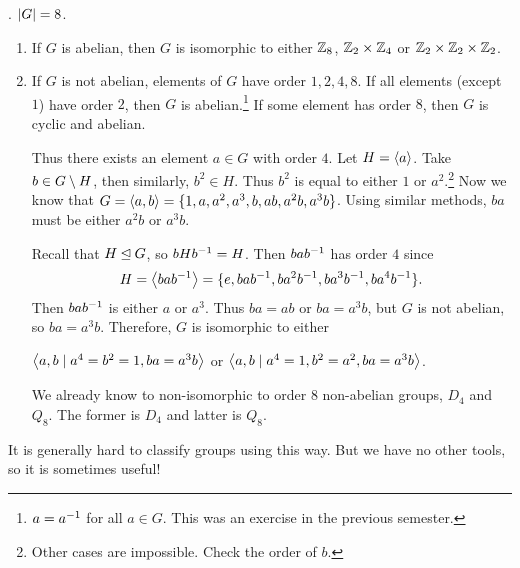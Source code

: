 \ex. \(\left| G \right| = 8\).
\begin{enumerate}
    \item If \(G\) is abelian, then \(G\) is isomorphic to either \(\mathbb{Z}_8\), \(\mathbb{Z}_2 \times \mathbb{Z}_4\) or \(\mathbb{Z}_2 \times \mathbb{Z}_2 \times \mathbb{Z}_2\).
    \item If \(G\) is not abelian, elements of \(G\) have order \(1, 2, 4, 8\). If all elements (except \(1\)) have order \(2\), then \(G\) is abelian.\footnote{\(a = a^{-1}\) for all \(a \in G\). This was an exercise in the previous semester.} If some element has order \(8\), then \(G\) is cyclic and abelian.

    Thus there exists an element \(a \in G\) with order \(4\). Let \(H = \left\langle a \right\rangle\). Take \(b \in G \setminus H\), then similarly, \(b^2 \in H\). Thus \(b^2 \) is equal to either \(1\) or \(a^2\).\footnote{Other cases are impossible. Check the order of \(b\).} Now we know that \(G = \left\langle a, b \right\rangle = \{1, a, a^2, a^3, b, ab, a^2b, a^3b\}\). Using similar methods, \(ba\) must be either \(a^2b\) or \(a^3b\).

          Recall that \(H \unlhd G\), so \(bHb^{-1} = H\). Then \(bab^{-1}\) has order \(4\) since
          \[
              H = \left\langle bab^{-1} \right\rangle = \{e, bab^{-1}, ba^2b^{-1}, ba^3b^{-1}, ba^4b^{-1}\}.
          \]
          Then \(bab^{-1}\) is either \(a\) or \(a^3\). Thus \(ba = ab\) or \(ba = a^3b\), but \(G\) is not abelian, so \(ba = a^3b\). Therefore, \(G\) is isomorphic to either
          \begin{center}
              \(\left\langle a, b \mid a^4 = b^2 = 1, ba = a^3b \right\rangle\) \quad or \quad \(\left\langle a, b \mid a^4 = 1, b^2 = a^2, ba = a^3b \right\rangle\).
          \end{center}
          We already know to non-isomorphic to order \(8\) non-abelian groups, \(D_4\) and \(Q_8\). The former is \(D_4\) and latter is \(Q_8\).
\end{enumerate}

It is generally hard to classify groups using this way. But we have no other tools, so it is sometimes useful!

\pagebreak

